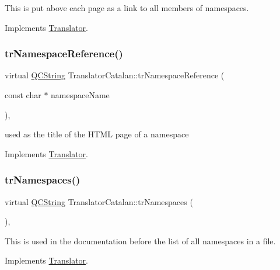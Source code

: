 This is put above each page as a link to all members of namespaces. 

Implements \mbox{\hyperlink{class_translator}{Translator}}.

\mbox{\label{class_translator_catalan_a5d20d34293b75cb0f8d13ec4b0e9edc6}} 
\subsubsection{\texorpdfstring{trNamespaceReference()}{trNamespaceReference()}}
{\footnotesize\ttfamily virtual \mbox{\hyperlink{class_q_c_string}{Q\+C\+String}} Translator\+Catalan\+::tr\+Namespace\+Reference (\begin{DoxyParamCaption}\item[{const char $\ast$}]{namespace\+Name }\end{DoxyParamCaption})\hspace{0.3cm}{\ttfamily [inline]}, {\ttfamily [virtual]}}

used as the title of the H\+T\+ML page of a namespace 

Implements \mbox{\hyperlink{class_translator}{Translator}}.

\mbox{\label{class_translator_catalan_af8011b478bdbc479706a793365e0f5a7}} 
\subsubsection{\texorpdfstring{trNamespaces()}{trNamespaces()}}
{\footnotesize\ttfamily virtual \mbox{\hyperlink{class_q_c_string}{Q\+C\+String}} Translator\+Catalan\+::tr\+Namespaces (\begin{DoxyParamCaption}{ }\end{DoxyParamCaption})\hspace{0.3cm}{\ttfamily [inline]}, {\ttfamily [virtual]}}

This is used in the documentation before the list of all namespaces in a file. 

Implements \mbox{\hyperlink{class_translator}{Translator}}.

\mbox{\label{class_translator_catalan_ab50afd95cd8aa1bf1ebaadf11a5b26c7}} 
